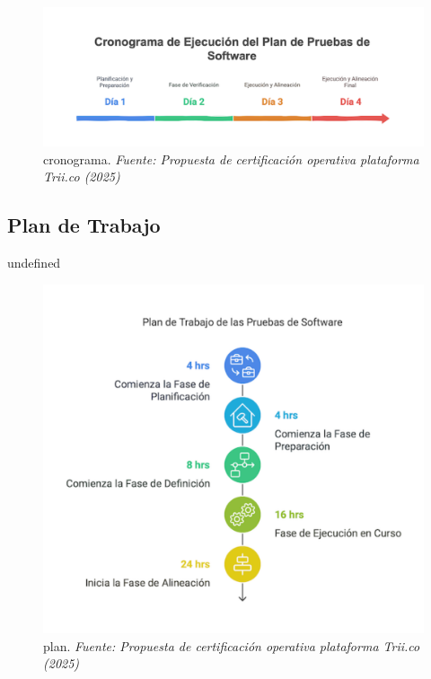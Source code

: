 \documentclass[
  paper=a4,
  ,captions=tableheading
]{scrartcl}
\renewenvironment{quote}{\begin{customblockquote}\list{}{\rightmargin=0em\leftmargin=0em}%
\item\relax\color{blockquote-text}\ignorespaces}{\unskip\unskip\endlist\end{customblockquote}}
\begin{document}
\begin{figure}
\centering
\includegraphics{images/cronograma.png}
\caption{cronograma. \emph{Fuente: Propuesta de certificación operativa
plataforma Trii.co
(2025)}}\label{fig:id-c25995aaf9a249059f91f586acdbec41}
\end{figure}

\subsection{Plan de Trabajo}\label{sec:plan-de-trabajo-1}

\begin{quote}
undefined
\end{quote}

\begin{figure}
\centering
\includegraphics{images/plan.png}
\caption{plan. \emph{Fuente: Propuesta de certificación operativa
plataforma Trii.co
(2025)}}\label{fig:id-49930878d254405eba38b006b1b9f180}
\end{figure}
\end{document}

